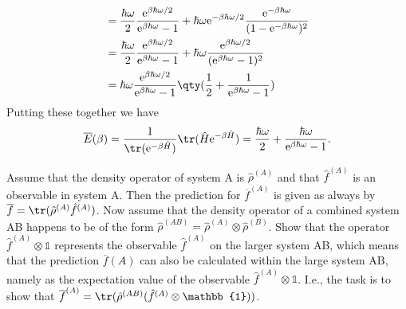 \documentclass[boxes,pages]{homework}
\makeatletter
\newcommand{\e}{\mathrm{e}}
\numberwithin{@problem}{section}
\makeatother
\begin{document}
\begin{solution}
\begin{align*}
		                               & = \frac{\hbar\omega}{2}\frac{\e^{\beta\hbar\omega/2}}{\e^{\beta\hbar\omega} - 1} + \hbar\omega\e^{-\beta\hbar\omega/2}\frac{\e^{-\beta\hbar\omega}}{(1 - \e^{-\beta\hbar\omega})^2} \\
		                               & = \frac{\hbar\omega}{2}\frac{\e^{\beta\hbar\omega/2}}{\e^{\beta\hbar\omega} - 1} + \hbar\omega\frac{\e^{\beta\hbar\omega/2}}{(\e^{\beta\hbar\omega} - 1)^2}                         \\
		                               & = \hbar\omega\frac{\e^{\beta\hbar\omega/2}}{\e^{\beta\hbar\omega} - 1}\qty(\frac{1}{2} + \frac{1}{\e^{\beta\hbar\omega} - 1})
	\end{align*}
	Putting these together we have
	\begin{equation*}
		\overline{E}(\beta) = \frac{1}{\tr(\e^{-\beta \hat{H}})}\tr(\hat{H}\e^{-\beta\hat{H}}) = \frac{\hbar\omega}{2} + \frac{\hbar\omega}{\e^{\beta\hbar\omega} - 1}.
	\end{equation*}
\end{solution}

\setcounter{section}{13}

\begin{problem}
Assume that the density operator of system A is $\hat{\rho}^{(A)}$ and that $\hat{f}^{(A)}$ is an observable in system A. Then the prediction for $\overline{f}^{(A)}$ is given as always by $\overline{f} = \tr(\hat{\rho}^{(A)}\hat{f}^{(A)})$. Now assume that the density operator of a combined system AB happens to be of the form $\hat{\rho}^{(AB)} = \hat{\rho}^{(A)}\otimes\hat{\rho}^{(B)}$. Show that the operator $\hat{f}^{(A)}\otimes\mathbb{1}$ represents the observable $\hat{f}^{(A)}$ on the larger system AB, which means that the prediction $\overline{f}(A)$ can also be calculated within the large system AB, namely as the expectation value of the observable $\hat{f}^{(A)}\otimes\mathbb{1}$. I.e., the task is to show that $\overline{f}^{(A)} = \tr(\hat{\rho}^{(AB)}(\hat{f}^{(A)}\otimes\mathbb{1}))$.
\end{problem}
\end{document}
